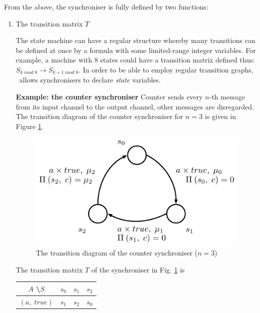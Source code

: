 From the above, the synchroniser is fully defined by two functions:
  \begin{enumerate}
  \item The transition matrix $T$

The state machine can have a regular structure whereby many transitions can be defined at once by a formula with some limited-range integer variables. For example, a machine with 8 states could have a transition matrix defined thus: $S_{k \; mod \; 8} \to S_{k+1 \; mod \; 8}$. In order to be able to employ regular transition graphs, \ak\ allows synchronisers to declare \emph{state} variables.

\textbf{Example: the counter synchroniser}  Counter sends every $n$-th message from its input channel to the output channel, other messages are disregarded. The transition diagram of the counter synchroniser for $n = 3$ is given in Figure \ref{fig:chapter_02_cnt_unroll}.

  \begin{figure}[here]
  \centering
  \includegraphics[scale=0.8]{figs/chapter_02_cnt_unroll.pdf}
  \caption{The transition diagram of the counter synchroniser ($n = 3$)}
  \label{fig:chapter_02_cnt_unroll}
  \end{figure}

The transition matrix $T$ of the synchroniser in Fig. \ref{fig:chapter_02_cnt_unroll} is
  \begin{tabular}{c|c|c|c}
  $A$ \textbackslash $S$ & $s_{0}$ & $s_{1}$ & $s_{2}$\\
  \hline
  $(a, \; true)$ & $s_{1}$ & $s_{2}$ & $s_{0}$\\
  \end{tabular}


\end{enumerate}
